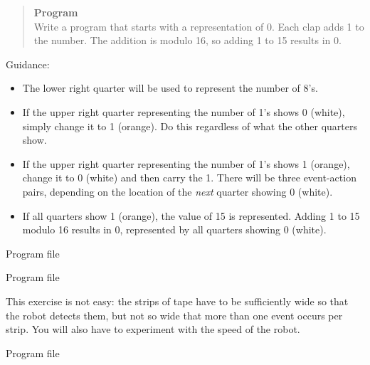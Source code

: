 \begin{quote}
\textbf{Program}\\
Write a program that starts with a representation of 0.
Each clap adds 1 to the number.
The addition is modulo 16, so adding 1 to 15 results in 0.
\end{quote}

Guidance:

\begin{itemize}
\item The lower right quarter will be used to represent the number of 8's.
\item If the upper right quarter representing the number
of 1's shows 0 (white),
simply change it to 1 (orange). Do this regardless of what the other
quarters show.
\item If the upper right quarter representing the number of 1's
shows 1 (orange),
change it to 0 (white) and then carry the 1.
There will be three event-action pairs,
depending on the location of the \emph{next} quarter showing 0
(white).
\item If all quarters show 1 (orange), the value of 15 is represented.
Adding 1 to 15 modulo 16 results in 0, represented by all quarters
showing 0 (white).
\end{itemize}


{\raggedleft \hfill Program file }


{\raggedleft \hfill Program file }


This exercise is not easy: the strips of tape have to be
sufficiently wide so that the robot detects them,
but not so wide that more than one event occurs per strip.
You will also have to experiment with the speed of the robot.

{\raggedleft \hfill Program file }
